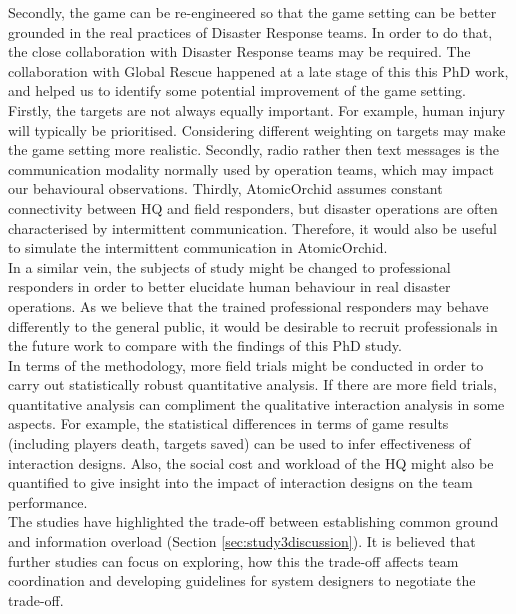 Secondly, the game can be re-engineered so that the game setting can be better grounded in the real practices of Disaster Response teams. In order to do that, the close collaboration with Disaster Response teams may be required. The collaboration with Global Rescue happened at a late stage of this this PhD work, and helped us to identify some potential improvement of the game setting. Firstly, the targets are not always equally important. For example, human injury will typically be prioritised. Considering different weighting on targets may make the game setting more realistic. Secondly, radio rather then text messages is the communication modality normally used by operation teams, which may impact our behavioural observations. Thirdly, AtomicOrchid assumes constant connectivity between HQ and field responders, but disaster operations are often characterised by intermittent communication. Therefore, it would also be useful to simulate the intermittent communication in AtomicOrchid.  \\

In a similar vein, the subjects of study might be changed to professional responders in order to better elucidate human behaviour in real disaster operations.  As we believe that the trained professional responders may behave differently to the general public, it would be desirable to recruit professionals in the future work to compare with the findings of this PhD study.\\

In terms of the methodology, more field trials might be conducted in order to carry out statistically robust quantitative analysis. If there are more field trials, quantitative analysis can compliment the qualitative interaction analysis in some aspects. For example, the statistical differences in terms of game results (including players death, targets saved) can be used to infer effectiveness of interaction designs. Also, the social cost and workload of the HQ might also be quantified  to give insight into the impact of interaction designs on the team performance. \\ %

The studies have highlighted the trade-off between establishing common ground and information overload (Section \ref{sec:study3discussion}). It is believed that further studies can focus on exploring, how this the trade-off affects team coordination and developing guidelines for system designers to negotiate the trade-off. \\  

